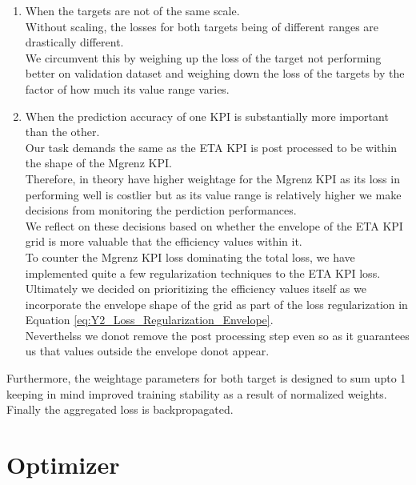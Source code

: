 \documentclass{report} %
\begin{document}
\begin{enumerate}
    \item  When the targets are not of the same scale. \\
    Without scaling, the losses for both targets being of different ranges are drastically different.\\
    We circumvent this by weighing up the loss of the target not performing better on validation dataset and weighing down the loss of the targets by the factor of how much its value range varies. \\
    \item When the prediction accuracy of one \ac{KPI} is substantially more important than the other. \\
    Our task demands the same as the ETA \ac{KPI} is post processed to be within the shape of the Mgrenz \ac{KPI}. \\
    Therefore, in theory have higher weightage for the Mgrenz \ac{KPI} as its loss in performing well is costlier but as its value range is relatively higher we make decisions from monitoring the perdiction performances.\\
    We reflect on these decisions based on whether the envelope of the ETA \ac{KPI} grid is more valuable that the efficiency values within it.\\
    To counter the Mgrenz \ac{KPI} loss dominating the total loss, we have implemented quite a few regularization techniques to the ETA \ac{KPI} loss.\\
    Ultimately we decided on prioritizing the efficiency values itself as we incorporate the envelope shape of the grid as part of the loss regularization in Equation \ref{eq:Y2_Loss_Regularization_Envelope}.\\
    Neverthelss we donot remove the post processing step even so as it guarantees us that values outside the envelope donot appear.
\end{enumerate}
Furthermore, the weightage parameters for both target is designed to sum upto 1 keeping in mind improved training stability as a result of normalized weights. \\

Finally the aggregated loss is backpropagated.\\
\vspace{0.2cm} %

\section{Optimizer}\label{sec:Optimizer}
\end{document}

